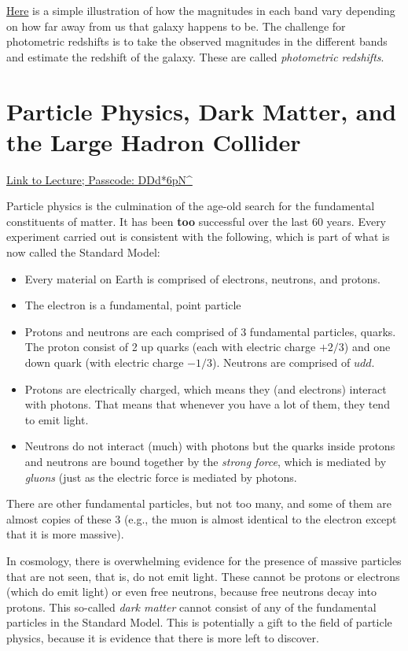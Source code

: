 \documentclass[prd,amsmath,aps,floats,amssymb, floatfix,
  superscriptaddress,nofootinbib]{revtex4-1}
\numberwithin{equation}{section}
\newcommand\bei{\begin{itemize}}
\newcommand\eei{\end{itemize}}
\begin{document}
\href{https://www.kaggle.com/c/photometric-redshift-estimation-2019}{Here} is a simple illustration of how the magnitudes in each band vary depending on how far away from us that galaxy happens to be. The challenge for photometric redshifts is to take the observed magnitudes in the different bands and estimate the redshift of the galaxy. These are called {\it photometric redshifts}.


\section{Particle Physics, Dark Matter, and the Large Hadron Collider}

\href{https://cmu.zoom.us/rec/share/M26ZDfLR_giq7wdeln1DN4T9mGCBO9OBklY6bBRwkD2ivbNxnB-5sqsqdFGTrjEI.3Ug9tThx9aFomknL}{Link to Lecture; Passcode: DDd*6pN\^}

Particle physics is the culmination of the age-old search for the fundamental constituents of matter. It has been {\bf too} successful over the last 60 years. Every experiment carried out is consistent with the following, which is part of what is now called the Standard Model:
\bei
\item Every material on Earth is comprised of electrons, neutrons, and protons.
\item The electron is a fundamental, point particle
\item Protons and neutrons are each comprised of 3 fundamental particles, quarks. The proton consist of 2 up quarks (each with electric charge $+2/3$) and one down quark (with electric charge $-1/3$). Neutrons are comprised of $udd$.
\item Protons are electrically charged, which means they (and electrons) interact with photons. That means that whenever you have a lot of them, they tend to emit light. 
\item Neutrons do not interact (much) with photons but the quarks inside protons and neutrons are bound together by the {\it strong force}, which is mediated by {\it gluons} (just as the electric force is mediated by photons.
\eei
There are other fundamental particles, but not too many, and some of them are almost copies of these 3 (e.g., the muon is almost identical to the electron except that it is more massive).

In cosmology, there is overwhelming evidence for the presence of massive particles that are not seen, that is, do not emit light. These cannot be protons or electrons (which do emit light) or even free neutrons, because free neutrons decay into protons. This so-called {\it dark matter} cannot consist of any of the fundamental particles in the Standard Model. This is potentially a gift to the field of particle physics, because it is evidence that there is more left to discover. 
\end{document}
